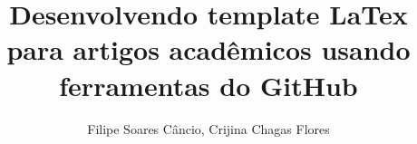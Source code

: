 \title{Desenvolvendo template LaTex para artigos acadêmicos usando ferramentas do GitHub}

\author{Filipe Soares Câncio, Crijina Chagas Flores }


\address{IFBA – Instituto Federal de Educação, Ciência e Tecnologia da Bahia\\
Vitória da Conquista – BA – Brasil
}
